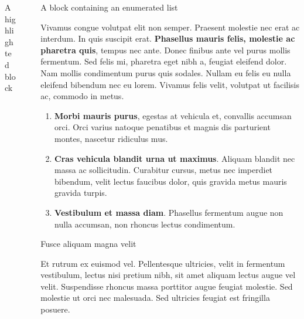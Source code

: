 \documentclass[final]{beamer}
\newlength{\sepwidth}
\newlength{\colwidth}
\newcommand{\separatorcolumn}{\begin{column}{\sepwidth}\end{column}}
\begin{document}
\begin{frame}[t]
\begin{columns}[t]
\begin{column}{\colwidth}
\begin{alertblock}{A highlighted block}
  \end{alertblock}

\end{column}

\separatorcolumn



\begin{column}{\colwidth}

  \begin{block}{A block containing an enumerated list}

    Vivamus congue volutpat elit non semper. Praesent molestie nec erat ac
    interdum. In quis suscipit erat. \textbf{Phasellus mauris felis, molestie
    ac pharetra quis}, tempus nec ante. Donec finibus ante vel purus mollis
    fermentum. Sed felis mi, pharetra eget nibh a, feugiat eleifend dolor. Nam
    mollis condimentum purus quis sodales. Nullam eu felis eu nulla eleifend
    bibendum nec eu lorem. Vivamus felis velit, volutpat ut facilisis ac,
    commodo in metus.

    \begin{enumerate}
      \item \textbf{Morbi mauris purus}, egestas at vehicula et, convallis
        accumsan orci. Orci varius natoque penatibus et magnis dis parturient
        montes, nascetur ridiculus mus.
      \item \textbf{Cras vehicula blandit urna ut maximus}. Aliquam blandit nec
        massa ac sollicitudin. Curabitur cursus, metus nec imperdiet bibendum,
        velit lectus faucibus dolor, quis gravida metus mauris gravida turpis.
      \item \textbf{Vestibulum et massa diam}. Phasellus fermentum augue non
        nulla accumsan, non rhoncus lectus condimentum.
    \end{enumerate}

  \end{block}

  \begin{block}{Fusce aliquam magna velit}

    Et rutrum ex euismod vel. Pellentesque ultricies, velit in fermentum
    vestibulum, lectus nisi pretium nibh, sit amet aliquam lectus augue vel
    velit. Suspendisse rhoncus massa porttitor augue feugiat molestie. Sed
    molestie ut orci nec malesuada. Sed ultricies feugiat est fringilla
    posuere.


\end{block}
\end{column}
\end{columns}
\end{frame}
\end{document}
